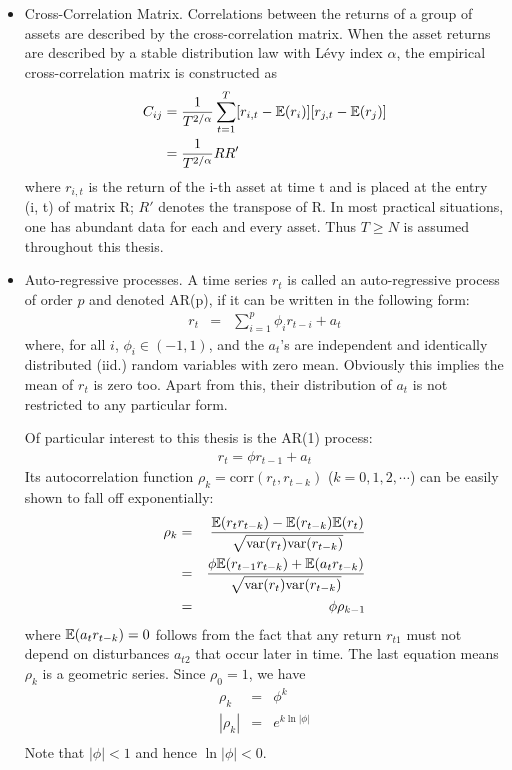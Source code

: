 \documentclass{report}
\begin{document}
\begin{itemize}
\item Cross-Correlation Matrix. Correlations between the returns of a
  group of assets are described by the cross-correlation matrix. When
  the asset returns are described by a stable distribution law with
  L\'evy index $\alpha$, the empirical cross-correlation matrix is
  constructed as
  \begin{equation}
    \label{eq:cross-correlation}
    \begin{aligned}
      C_{ij} &= {1 \over T^{2/\alpha}} \sum_{t=1}^T [r_{i,t}-\mathbb{E}(r_i)]
      [r_{j,t}-\mathbb{E}(r_j)] \\
      &= {1 \over T^{2/\alpha}} RR'
    \end{aligned}
  \end{equation}
  where $r_{i,t}$ is the return of the i-th asset at time t and is
  placed at the entry (i, t) of matrix R; $R'$ denotes the
  transpose of R. In most practical situations, one has abundant data
  for each and every asset. Thus $T \geq N$ is assumed throughout this
  thesis.

\item Auto-regressive processes. A time series $r_t$ is called an
  auto-regressive process of order $p$ and denoted AR(p), if it can be
  written in the following form:
  \begin{eqnarray*}
    r_t &=& \sum_{i=1}^p \phi_i r_{t-i} + a_t
  \end{eqnarray*}
  where, for all $i$, $\phi_i \in (-1, 1)$, and the $a_t$'s are
  independent and identically distributed (iid.) random variables with
  zero mean. Obviously this implies the mean of $r_t$ is zero
  too. Apart from this, their distribution of $a_t$ is not restricted
  to any particular form.
  
  Of particular interest to this thesis is the AR(1) process:
  \begin{eqnarray*}
    r_t = \phi r_{t-1} + a_t
  \end{eqnarray*}
  Its autocorrelation function $\rho_k = \text{corr}(r_t, r_{t-k})$
  ($k = 0, 1, 2, \cdots$) can be easily shown to fall off
  exponentially:
  \begin{eqnarray*}
    \rho_k &=& {\mathbb{E}(r_tr_{t-k}) - \mathbb{E}(r_{t-k})\mathbb{E}(r_{t}) \over
      \sqrt{\text{var}(r_t) \text{var}(r_{t-k})}} \\
    &=& {\phi \mathbb{E}(r_{t-1}r_{t-k}) + \mathbb{E}(a_t r_{t-k})
      \over
      \sqrt{\text{var}(r_t) \text{var}(r_{t-k})}
    } \\
    &=& \phi \rho_{k-1}
  \end{eqnarray*}
  where $\mathbb{E}(a_t r_{t-k}) = 0$ follows from the fact that any return
  $r_{t1}$ must not depend on disturbances $a_{t2}$ that occur later
  in time. The last equation means $\rho_k$ is a geometric series. Since
  $\rho_0 = 1$, we have
  \begin{eqnarray*}
    \rho_k &=& \phi^k \\
    |\rho_k| &=& e^{k\ln|\phi|} \\
  \end{eqnarray*}
  Note that $|\phi| < 1$ and hence $\ln|\phi| < 0$.


\end{itemize}
\end{document}
